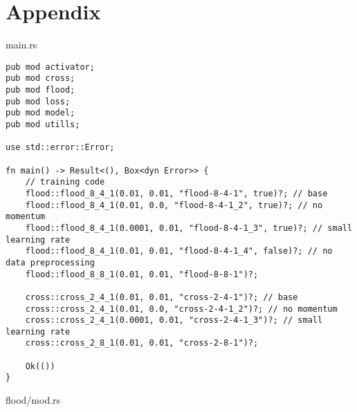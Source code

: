 
\section*{Appendix}
main.rs
\begin{verbatim}
pub mod activator;
pub mod cross;
pub mod flood;
pub mod loss;
pub mod model;
pub mod utills;

use std::error::Error;

fn main() -> Result<(), Box<dyn Error>> {
    // training code
    flood::flood_8_4_1(0.01, 0.01, "flood-8-4-1", true)?; // base
    flood::flood_8_4_1(0.01, 0.0, "flood-8-4-1_2", true)?; // no momentum
    flood::flood_8_4_1(0.0001, 0.01, "flood-8-4-1_3", true)?; // small learning rate
    flood::flood_8_4_1(0.01, 0.01, "flood-8-4-1_4", false)?; // no data preprocessing
    flood::flood_8_8_1(0.01, 0.01, "flood-8-8-1")?; 

    cross::cross_2_4_1(0.01, 0.01, "cross-2-4-1")?; // base
    cross::cross_2_4_1(0.01, 0.0, "cross-2-4-1_2")?; // no momentum
    cross::cross_2_4_1(0.0001, 0.01, "cross-2-4-1_3")?; // small learning rate
    cross::cross_2_8_1(0.01, 0.01, "cross-2-8-1")?;

    Ok(())
}
\end{verbatim}
\noindent flood/mod.rs
